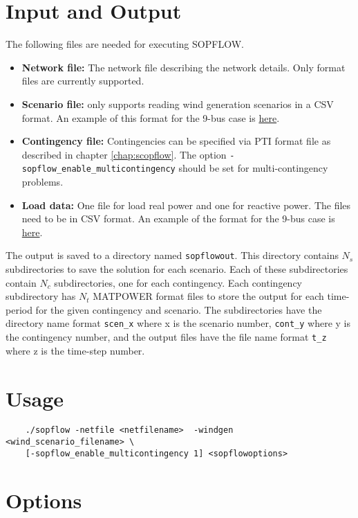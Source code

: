 \section{Input and Output}
The following files are needed for executing SOPFLOW.
\begin{itemize}
    \item \textbf{Network file:} The network file describing the network details. Only \matpower format files are currently supported.
    \item \textbf{Scenario file:} \sopflow only supports reading wind generation scenarios in a CSV format. An example of this format for the 9-bus case is \href{https://gitlab.pnnl.gov/exasgd/frameworks/exago/-/tree/master/datafiles/case9/scenarios_9bus.csv}{here}.
    \item \textbf{Contingency file:} Contingencies can be specified via PTI format file as described in chapter \ref{chap:scopflow}. The option \lstinline{-sopflow_enable_multicontingency} should be set for multi-contingency problems.
    \item \textbf{Load data:} One file for load real power and one for reactive power. The files need to be in CSV format. An example of the format for the 9-bus case is \href{https://gitlab.pnnl.gov/exasgd/frameworks/exago/-/tree/master/datafiles/case9}{here}.
\end{itemize}

The \sopflow output is saved to a directory named \texttt{sopflowout}. This
directory contains $N_s$ subdirectories to save the solution for each scenario.
Each of these subdirectories contain $N_c$ subdirectories, one for each
contingency. Each contingency subdirectory has $N_t$ MATPOWER format files to
store the output for each time-period for the given contingency and scenario.
The subdirectories have the directory name format \texttt{scen_x} where x is
the scenario number,  \texttt{cont_y} where y is the contingency number, and
the output files have the file name format \texttt{t_z} where z is the time-step number.

\section{Usage}
\begin{lstlisting}
    ./sopflow -netfile <netfilename>  -windgen <wind_scenario_filename> \
    [-sopflow_enable_multicontingency 1] <sopflowoptions>
\end{lstlisting}

\section{Options}

